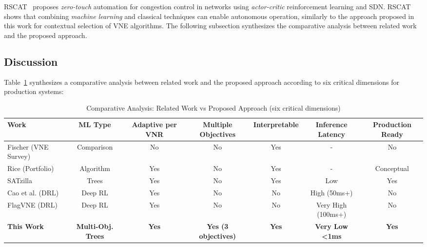 \documentclass[conference]{IEEEtran}
\begin{document}
RSCAT~\cite{diel2023rscat} proposes \textit{zero-touch} automation for congestion control in networks using \textit{actor-critic} reinforcement learning and SDN.
RSCAT shows that combining \textit{machine learning} and classical techniques can enable autonomous operation, similarly to the approach proposed in this work for contextual selection of VNE algorithms. The following subsection synthesizes the comparative analysis between related work and the proposed approach.

\subsection{Discussion}

Table~\ref{tab:related-work} synthesizes a comparative analysis between related work and the proposed approach according to six critical dimensions for production systems:

\begin{table}[t]
\centering
\caption{Comparative Analysis: Related Work vs Proposed Approach (six critical dimensions)}
\label{tab:related-work}
\begin{tabular}{lcccccc}
\toprule
\textbf{Work} & \textbf{ML Type} & \textbf{Adaptive per VNR} & \textbf{Multiple Objectives} & \textbf{Interpretable} & \textbf{Inference Latency} & \textbf{Production Ready} \\
\midrule
Fischer (VNE Survey) & Comparison & No & No & Yes & - & No \\
Rice (Portfolio) & Algorithm & Yes & No & Yes & - & Conceptual \\
SATzilla & Trees & Yes & No & Yes & Low & Yes \\
Cao et al. (DRL) & Deep RL & Yes & No & No & High (50ms+) & No \\
FlagVNE (DRL) & Deep RL & Yes & No & No & Very High (100ms+) & No \\
\midrule
\textbf{This Work} & \textbf{Multi-Obj. Trees} & \textbf{Yes} & \textbf{Yes (3 objectives)} & \textbf{Yes} & \textbf{Very Low <1ms} & \textbf{Yes} \\
\bottomrule
\end{tabular}
\end{table}
\end{document}
